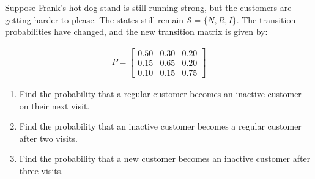\begin{Exercise}[title={Frank's Hot Dog stand, returns}, label={ex:markov_2}]

    Suppose Frank's hot dog stand is still running strong, but the customers are getting harder to please. The states still remain $\mathcal{S} = \{N, R, I\}$. The transition probabilities have changed, and the new transition matrix is given by:

    $$\begin{array}{c} P=
            \begin{bmatrix}
                0.50 & 0.30 & 0.20 \\
                0.15 & 0.65 & 0.20 \\
                0.10 & 0.15 & 0.75
            \end{bmatrix}\end{array}$$

    \begin{enumerate}
        \item Find the probability that a regular customer becomes an inactive customer on their next visit.
        \item Find the probability that an inactive customer becomes a regular customer after two visits.
        \item Find the probability that a new customer becomes an inactive customer after three visits.
    \end{enumerate}

\end{Exercise}
